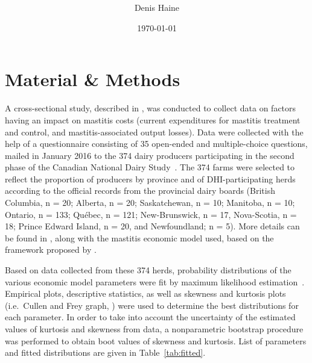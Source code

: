 \documentclass{article}\usepackage[]{graphicx}\usepackage[]{color}
\author{Denis Haine}
\title{\textcolor{myorange}{\titl}}
\date{\today}
\begin{document}
\maketitle
\listoftables
\clearpage
{}



\def\inclcode{1}


\section{Material \& Methods}

A cross-sectional study, described in \citet{aghamohammadi_2018}, was conducted
to collect data on factors having an impact on mastitis costs (current expenditures
for mastitis treatment and control, and mastitis-associated output losses).
Data were collected with the help of a questionnaire consisting of 35 open-ended
and multiple-choice questions, mailed in January 2016 to the 374 dairy producers
participating in the second phase of the Canadian National Dairy
Study~\cite{BELAGE20173839}.
The 374 farms were selected to reflect the proportion of producers by province
and of DHI-participating herds according to the official records from the
provincial dairy boards (British Columbia, n = 20; Alberta, n = 20;
Saskatchewan, n = 10; Manitoba, n = 10; Ontario, n = 133; Québec, n = 121;
New-Brunswick, n = 17, Nova-Scotia, n = 18; Prince Edward Island, n = 20, and
Newfoundland; n = 5).
More details can be found in \citet{aghamohammadi_2018}, along with the mastitis
economic model used, based on the framework proposed by \citet{Halasa_2007}.

Based on data collected from these 374 herds, probability distributions of the
various economic model parameters were fit by maximum likelihood
estimation~\cite{JSSv064i04}.
Empirical plots, descriptive statistics, as well as skewness and kurtosis
plots (i.e.\ Cullen and Frey graph, \citealp{Cullen_Frey_1999}) were used to
determine the best distributions for each parameter.
In order to take into account the uncertainty of the estimated values of
kurtosis and skewness from data, a nonparametric bootstrap
procedure~\cite{Efron_Tibshirani_1994} was performed to obtain boot values of
skewness and kurtosis.
List of parameters and fitted distributions are given in Table~\ref{tab:fitted}.
\end{document}
